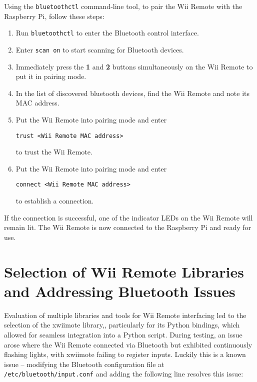 Using the \texttt{bluetoothctl}\cite{bluetoothctl} command-line tool, to pair the Wii Remote with the Raspberry Pi, follow these steps:

\begin{enumerate}
	\item Run \texttt{bluetoothctl} to enter the Bluetooth control interface.
	\item Enter \texttt{scan on} to start scanning for Bluetooth devices.
	\item Immediately press the \textbf{1} and \textbf{2} buttons simultaneously on the Wii Remote to put it in pairing mode.
	\item In the list of discovered bluetooth devices, find the Wii Remote and note its MAC address.
	\item Put the Wii Remote into pairing mode and enter
	      \begin{verbatim}
trust <Wii Remote MAC address>

\end{verbatim}
	      to trust the Wii Remote.

	\item Put the Wii Remote into pairing mode and enter
	      \begin{verbatim}
connect <Wii Remote MAC address>
\end{verbatim}
	      to establish a connection.

\end{enumerate}

If the connection is successful, one of the indicator LEDs on the Wii Remote will remain lit. The Wii Remote is now connected to the Raspberry Pi and ready for use.

\section{Selection of Wii Remote Libraries and Addressing Bluetooth Issues}

Evaluation of multiple libraries and tools for Wii Remote interfacing led to the selection of the xwiimote\cite{xwiimote} library,, particularly for its Python
bindings\cite{xwiimote_bindings}, which allowed for seamless integration into a
Python script. During testing, an issue arose where the Wii Remote connected via
Bluetooth but exhibited continuously flashing lights, with xwiimote failing to
register inputs. Luckily this is a known issue\cite{xwiimote_issue} -- modifying
the Bluetooth configuration file at \texttt{/etc/bluetooth/input.conf} and
adding the following line resolves this issue:

